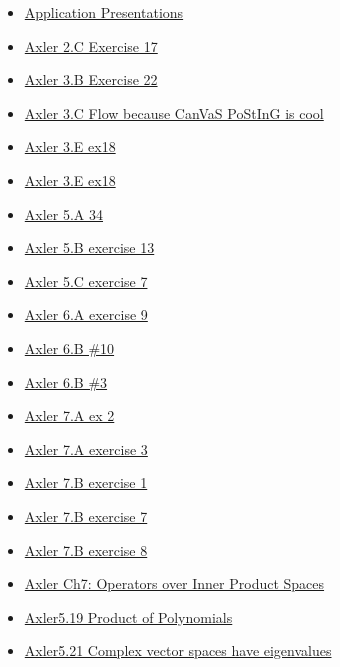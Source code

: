 \documentclass[11pt]{article}
\begin{document}
\begin{itemize}
\begin{itemize}
\begin{itemize}
\item \href{mathematics/linear\_algebra/KBe20math530floApplicationPresentations.org}{Application Presentations}
\item \href{mathematics/linear\_algebra/KBe20math530retAxler2C17.org}{Axler 2.C Exercise 17}
\item \href{mathematics/linear\_algebra/KBe20math530retAxler3B22.org}{Axler 3.B Exercise 22}
\item \href{mathematics/linear\_algebra/KBe20math530floAxler3C.org}{Axler 3.C Flow because CanVaS PoStInG is cool}
\item \href{mathematics/linear\_algebra/KBe21math530retAxler3E18.org}{Axler 3.E ex18}
\item \href{mathematics/linear\_algebra/KBe21math530retAxler3E18old.org}{Axler 3.E ex18}
\item \href{mathematics/linear\_algebra/KBe21math530retAxler5A34.org}{Axler 5.A 34}
\item \href{mathematics/linear\_algebra/KBe21math530retAxler5B13.org}{Axler 5.B exercise 13}
\item \href{mathematics/linear\_algebra/KBe21math530retAxler5C7.org}{Axler 5.C exercise 7}
\item \href{mathematics/linear\_algebra/KBe21math530retAxler6A9.org}{Axler 6.A exercise 9}
\item \href{mathematics/linear\_algebra/KBe21math530retAxler6B10.org}{Axler 6.B \#10}
\item \href{mathematics/linear\_algebra/KBe21math530retAxler6B3.org}{Axler 6.B \#3}
\item \href{mathematics/linear\_algebra/KBe21math530retAxler7A2.org}{Axler 7.A ex 2}
\item \href{mathematics/linear\_algebra/KBe21math530retAxler7A3.org}{Axler 7.A exercise 3}
\item \href{mathematics/linear\_algebra/KBe21math530retAxler7B1.org}{Axler 7.B exercise 1}
\item \href{mathematics/linear\_algebra/KBe21math530retAxler7B7.org}{Axler 7.B exercise 7}
\item \href{mathematics/linear\_algebra/KBe21math530retAxler7B8.org}{Axler 7.B exercise 8}
\item \href{mathematics/linear\_algebra/KBrefOperatorsOverInnerProductSpaces.org}{Axler Ch7: Operators over Inner Product Spaces}
\item \href{mathematics/linear\_algebra/KBrefProductOfPolynomials.org}{Axler5.19 Product of Polynomials}
\item \href{mathematics/linear\_algebra/KBrefComplexOperatorsHaveEigenvalues.org}{Axler5.21 Complex vector spaces have eigenvalues}

\end{itemize}
\end{itemize}
\end{itemize}
\end{document}
